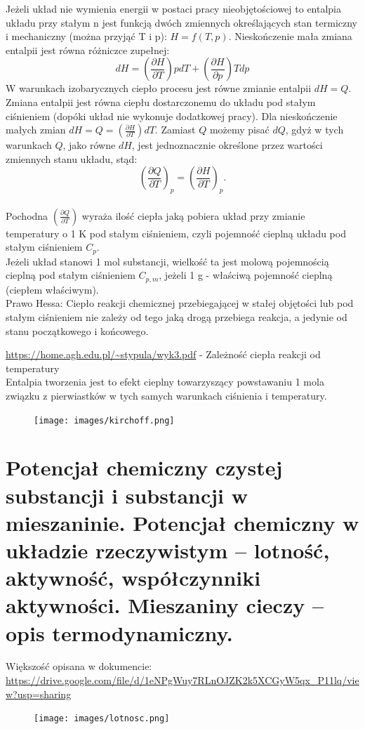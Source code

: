 \documentclass{article}
\begin{document}
Jeżeli układ nie wymienia energii w postaci pracy nieobjętościowej to entalpia układu przy stałym n jest funkcją dwóch zmiennych określających stan termiczny i mechaniczny (można przyjąć T i p): $H=f(T,p)$. Nieskończenie mała zmiana entalpii jest równa różniczce zupełnej:
\begin{equation}
    dH=\left( \frac{\partial H}{\partial T}\right)pdT + \left( \frac{\partial H}{\partial p}\right)Tdp
\end{equation}
W warunkach izobarycznych ciepło procesu jest równe zmianie entalpii $dH=Q$. Zmiana entalpii jest równa ciepłu dostarczonemu do układu pod stałym ciśnieniem (dopóki układ nie wykonuje dodatkowej pracy). Dla nieskończenie małych zmian $dH=Q=\left( \frac{\partial H}{\partial T}\right)dT$. Zamiast $Q$ możemy pisać $dQ$, gdyż w tych warunkach $Q$, jako równe $dH$, jest jednoznacznie określone przez wartości zmiennych stanu układu, stąd: 
\begin{equation}
    \left( \frac{\partial Q}{\partial T}\right)_p=\left( \frac{\partial H}{\partial T}\right)_p.
\end{equation}\\
Pochodna $\left( \frac{\partial Q}{\partial T}\right)$ wyraża ilość ciepła jaką pobiera układ przy zmianie temperatury o 1 K pod stałym ciśnieniem, czyli pojemność cieplną układu pod stałym ciśnieniem $C_p$. \\
Jeżeli układ stanowi 1 mol substancji, wielkość ta jest molową pojemnością cieplną pod stałym ciśnieniem $C_{p,m}$, jeżeli 1 g - właściwą pojemność cieplną (ciepłem właściwym). \\

Prawo Hessa: Ciepło reakcji chemicznej przebiegającej w stałej objętości lub pod stałym ciśnieniem nie zależy od tego jaką drogą przebiega reakcja, a jedynie od stanu początkowego i końcowego.

\url{https://home.agh.edu.pl/~stypula/wyk3.pdf} - Zależność ciepła reakcji od temperatury\\
Entalpia tworzenia jest to efekt cieplny towarzyszący powstawaniu 1 mola związku z pierwiastków w tych samych warunkach ciśnienia i temperatury. 
\begin{figure}[H]
    \centering
    \texttt{[image: images/kirchoff.png]}
\end{figure}

\section{Potencjał chemiczny czystej substancji i substancji w mieszaninie. Potencjał chemiczny w układzie rzeczywistym -- lotność, aktywność, współczynniki aktywności. Mieszaniny cieczy -- opis termodynamiczny.}
Większość opisana w dokumencie: \url{https://drive.google.com/file/d/1eNPgWuy7RLnOJZK2k5XCGyW5qx_P11lq/view?usp=sharing}
\begin{figure}[H]
    \centering
    \texttt{[image: images/lotnosc.png]}
\end{figure}
\end{document}
